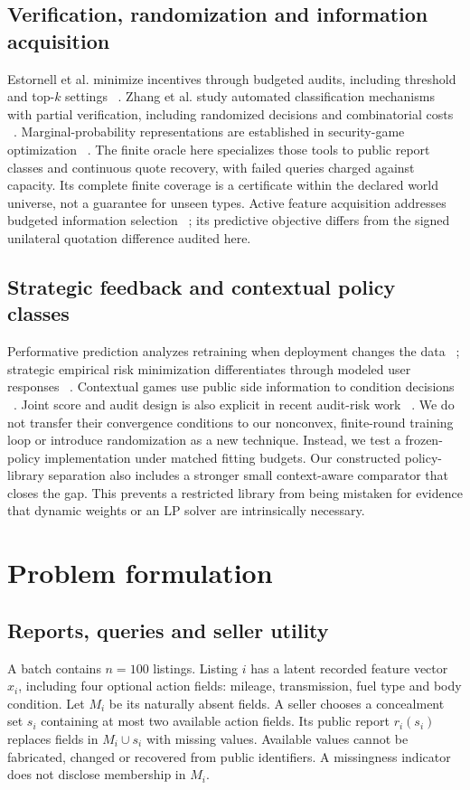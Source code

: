 \documentclass[11pt]{article}
\begin{document}
\subsection{Verification, randomization and information acquisition}
Estornell et al. minimize incentives through budgeted audits, including threshold
and top-$k$ settings ~\cite{audits}. Zhang et al. study automated classification
mechanisms with partial verification, including randomized decisions and
combinatorial costs ~\cite{partial}. Marginal-probability representations are
established in security-game optimization ~\cite{marginals}. The finite oracle
here specializes those tools to public report classes and continuous quote
recovery, with failed queries charged against capacity. Its complete finite
coverage is a certificate within the declared world universe, not a guarantee
for unseen types. Active feature acquisition addresses budgeted information
selection ~\cite{activeoracle}; its predictive objective differs from the signed
unilateral quotation difference audited here.

\subsection{Strategic feedback and contextual policy classes}
Performative prediction analyzes retraining when deployment changes the data
~\cite{performative}; strategic empirical risk minimization differentiates through
modeled user responses ~\cite{serm}. Contextual games use public side information
to condition decisions ~\cite{contextual}. Joint score and audit design is also
explicit in recent audit-risk work ~\cite{auditrisk}. We do not transfer their
convergence conditions to our nonconvex, finite-round training loop or introduce
randomization as a new technique. Instead, we test a frozen-policy implementation
under matched fitting budgets. Our constructed policy-library separation also
includes a stronger small context-aware comparator that closes the gap. This
prevents a restricted library from being mistaken for evidence that dynamic
weights or an LP solver are intrinsically necessary.

\section{Problem formulation}\label{sec:problem}
\subsection{Reports, queries and seller utility}
A batch contains $n=100$ listings. Listing $i$ has a latent recorded feature
vector $x_i$, including four optional action fields: mileage, transmission,
fuel type and body condition. Let $M_i$ be its naturally absent fields. A seller
chooses a concealment set $s_i$ containing at most two available action fields.
Its public report $r_i(s_i)$ replaces fields in $M_i\cup s_i$ with missing values.
Available values cannot be fabricated, changed or recovered from public
identifiers. A missingness indicator does not disclose membership in $M_i$.
\end{document}
